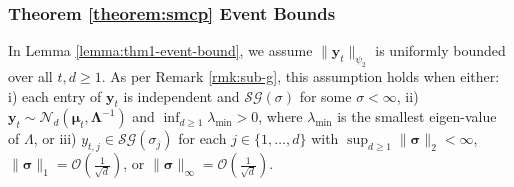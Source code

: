 
\subsubsection{Theorem \ref{theorem:smcp} Event Bounds}

In Lemma \ref{lemma:thm1-event-bound}, we assume $\lVert \mathbf{y}_t\rVert_{\psi_2}$ is uniformly bounded over all $t, d \geq 1$. As per Remark \ref{rmk:sub-g}, this assumption holds when either: i) each entry of $\mathbf{y}_t$ is independent and $\mathcal{SG}(\sigma)$ for some $\sigma < \infty$, ii) $\mathbf{y}_t \sim \mathcal{N}_d(\boldsymbol{\mu}_t, \boldsymbol{\Lambda}^{-1})$ and $\inf_{d\geq 1}  \lambda_{\min} > 0$, where $\lambda_{\min}$ is the smallest eigen-value of $\Lambda$, or iii) $y_{t,j} \in \mathcal{SG}(\sigma_j)$ for each $j \in \{1,\ldots, d\}$ with $\sup_{d \geq 1} \lVert\boldsymbol{\sigma}\rVert_2 < \infty$, $\lVert\boldsymbol{\sigma}\rVert_1 = \mathcal{O}\left(\frac{1}{\sqrt{d}}\right)$, or $\lVert\boldsymbol{\sigma}\rVert_\infty = \mathcal{O}\left(\frac{1}{\sqrt{d}}\right)$. 

